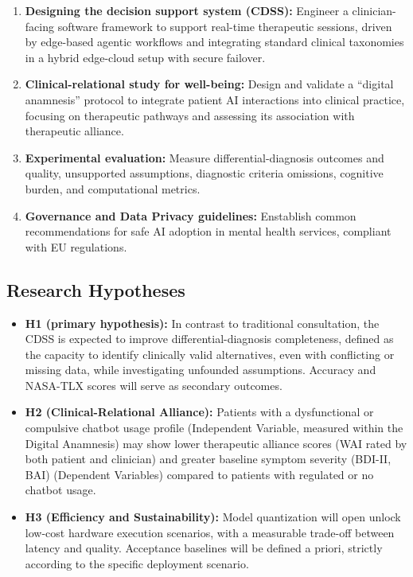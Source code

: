 \documentclass[11pt,a4paper]{article}
\begin{document}
\begin{enumerate}
    \item \textbf{Designing the decision support system (CDSS):} Engineer a clinician-facing software framework to support real-time therapeutic sessions, driven by edge-based agentic workflows and integrating standard clinical taxonomies in a hybrid edge-cloud setup with secure failover.
    \item \textbf{Clinical-relational study for well-being:} Design and validate a ``digital anamnesis'' protocol to integrate patient AI interactions into clinical practice, focusing on therapeutic pathways and assessing its association with therapeutic alliance.
    \item \textbf{Experimental evaluation:} Measure differential-diagnosis outcomes and quality, unsupported assumptions, diagnostic criteria omissions, cognitive burden, and computational metrics.
    \item \textbf{Governance and Data Privacy guidelines:} Enstablish common recommendations for safe AI adoption in mental health services, compliant with EU regulations.
\end{enumerate}

\subsection{Research Hypotheses}

\begin{itemize}
    \item \textbf{H1 (primary hypothesis):} In contrast to traditional consultation, the CDSS is expected to improve differential-diagnosis completeness, defined as the capacity to identify clinically valid alternatives, even with conflicting or missing data, while investigating unfounded assumptions. Accuracy and NASA-TLX scores will serve as secondary outcomes.
    \item \textbf{H2 (Clinical-Relational Alliance):} Patients with a dysfunctional or compulsive chatbot usage profile (Independent Variable, measured within the Digital Anamnesis) may show lower therapeutic alliance scores (WAI rated by both patient and clinician) and greater baseline symptom severity (BDI-II, BAI) (Dependent Variables) compared to patients with regulated or no chatbot usage.
    \item \textbf{H3 (Efficiency and Sustainability):} Model quantization will open unlock low-cost hardware execution scenarios, with a measurable trade-off between latency and quality. Acceptance baselines will be defined a priori, strictly according to the specific deployment scenario.
\end{itemize}
\end{document}
